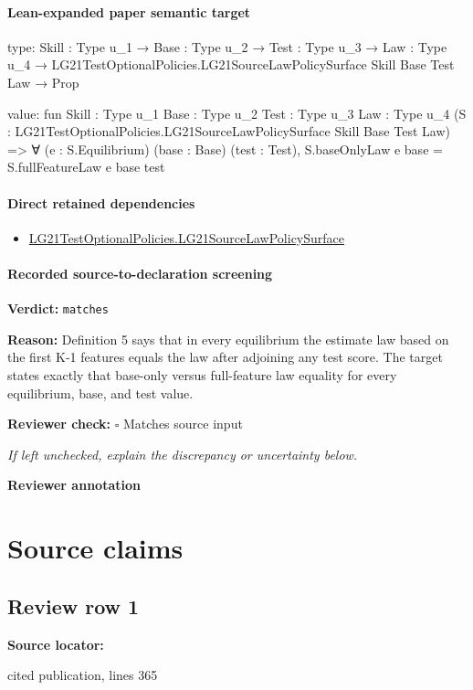 \documentclass[10pt]{article}
\newcommand{\reviewerbox}{%
  \par\noindent\fbox{\parbox{0.96\linewidth}{\rule{0pt}{0.38in}}}\par
}
\newcommand{\reviewmatch}[1]{%
  \par\noindent\textbf{Reviewer check:} $\square$\; #1\par
  \noindent\emph{If left unchecked, explain the discrepancy or uncertainty below.}\par
}
\begin{document}
\paragraph{Lean-expanded paper semantic target}
\begin{ReviewVerbatim}
type:
{Skill : Type u_1} →
  {Base : Type u_2} →
    {Test : Type u_3} →
      {Law : Type u_4} → LG21TestOptionalPolicies.LG21SourceLawPolicySurface Skill Base Test Law → Prop

value:
fun {Skill : Type u_1} {Base : Type u_2} {Test : Type u_3} {Law : Type u_4}
    (S : LG21TestOptionalPolicies.LG21SourceLawPolicySurface Skill Base Test Law) =>
  ∀ (e : S.Equilibrium) (base : Base) (test : Test), S.baseOnlyLaw e base = S.fullFeatureLaw e base test
\end{ReviewVerbatim}

\paragraph{Direct retained dependencies}
\begin{itemize}\raggedright
\item \hyperlink{governing-declaration-48965123e52b8b0f}{LG21\allowbreak{}Test\allowbreak{}Optional\allowbreak{}Policies.\allowbreak{}LG21\allowbreak{}Source\allowbreak{}Law\allowbreak{}Policy\allowbreak{}Surface}
\end{itemize}
\paragraph{Recorded source-to-declaration screening}
\textbf{Verdict:} \texttt{matches}
\\
{\raggedright
\textbf{Reason:} Definition 5 says that in every equilibrium the estimate law based on the first K-\allowbreak{}1 features equals the law after adjoining any test score.\allowbreak{} The target states exactly that base-\allowbreak{}only versus full-\allowbreak{}feature law equality for every equilibrium, base, and test value.\allowbreak{}
\par}
\reviewmatch{Matches source input}
\noindent\textbf{Reviewer annotation}\par
\reviewerbox

\clearpage
\hypertarget{source-claim-8b71c1403eedcaa5}{}
\hypertarget{source-section-f10b5f68e4acf3dc}{}
\section*{Source claims}
\subsection*{Review row 1}
\textbf{Source locator:} {\footnotesize\raggedright cited publication, lines 365\par}
\end{document}

